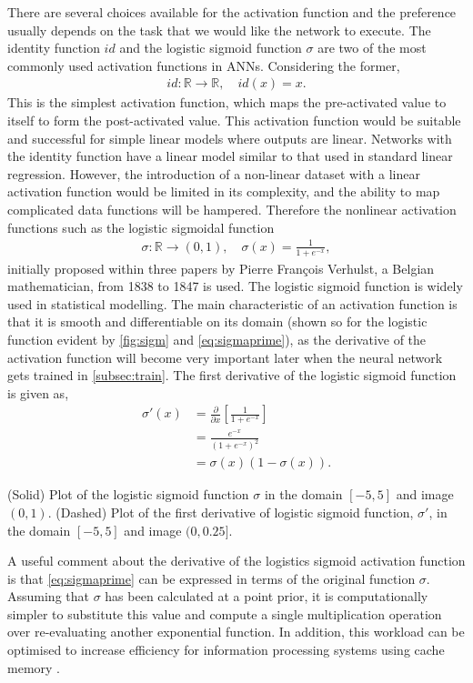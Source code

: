There are several choices available for the activation function and the preference usually depends on the task that we would like the network to execute. The identity function ${id}$ and the logistic sigmoid function $\sigma$ are two of the most commonly used activation functions in ANNs. Considering the former,
\begin{align*}
   {id}:\mathbb{R}\rightarrow \mathbb{R},\quad {id}(x) = x.
\end{align*}
This is the simplest activation function, which maps the pre-activated value to itself to form the post-activated value. This activation function would be suitable and successful for simple linear models where outputs are linear. Networks with the identity function have a linear model similar to that used in standard linear regression. However, the introduction of a non-linear dataset with a linear activation function would be limited in its complexity, and the ability to map complicated data functions will be hampered.  Therefore the nonlinear activation functions such as the logistic sigmoidal function
\begin{align*}
    \sigma:\mathbb{R}\rightarrow (0,1),\quad \sigma(x) = \frac{1}{1+e^{-x}},
\end{align*}
initially proposed within three papers by Pierre François Verhulst, a Belgian mathematician, from 1838 to 1847 is used. The logistic sigmoid function is widely used in statistical modelling. The main characteristic of an activation function is that it is smooth and differentiable on its domain (shown so for the logistic function evident by \autoref{fig:sigm} and \autoref{eq:sigmaprime}), as the derivative of the activation function will become very important later when the neural network gets trained in \autoref{subsec:train}. The first derivative of the logistic sigmoid function is given as,
\begin{align}
   \sigma'(x) &= \frac{\partial}{\partial x}\left[ \frac{1}{1+e^{-x}}\right] \nonumber \\
   &= \frac{e^{-x}}{(1 + e^{-x})^2} \nonumber \\
    &= \sigma(x)(1-\sigma(x)). \label{eq:sigmaprime}
\end{align}
\vspace{-6.5mm}
\begin{figh}
    
    \caption{(Solid) Plot of the logistic sigmoid function $\sigma$ in the domain $[-5,5]$ and image $(0,1)$. (Dashed) Plot of the first derivative of logistic sigmoid function, $\sigma '$, in the domain $[-5,5]$ and image $(0,0.25]$.}
    \label{fig:sigm}
\end{figh}
A useful comment about the derivative of the logistics sigmoid activation function is that \autoref{eq:sigmaprime} can be expressed in terms of the original function $\sigma$.  Assuming that $\sigma$ has been calculated at a point prior, it is computationally simpler to substitute this value and compute a single multiplication operation over re-evaluating another exponential function. In addition, this workload can be optimised to increase efficiency for information processing systems using cache memory \parencite{inproceedings}.
    